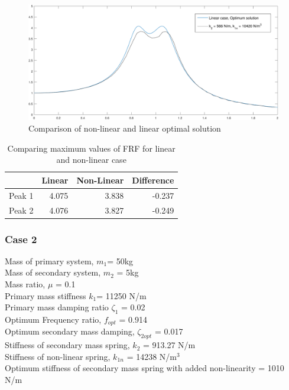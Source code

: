 \begin{figure}[h!]
\includegraphics[width=\textwidth, height = 0.5\textwidth]{"figures/2comparing"}
\caption{Comparison of non-linear and linear optimal solution}
\end{figure}

\begin{table}[h!]
\centering
\begin{tabular}{|r|r|r|r|}
\hline
 & Linear & Non-Linear & Difference \\ \hline
Peak 1& 4.075 & 3.838 & -0.237\\
Peak 2 & 4.076  & 3.827 & -0.249\\ \hline
\end{tabular}
\caption{Comparing maximum values of FRF for linear and non-linear case}
\end{table}

\subsubsection{Case 2}
Mass of primary system, $m_1$= 50kg\\
Mass of secondary system, $m_2$ = 5kg\\
Mass ratio, $\mu$ = 0.1\\
Primary mass stiffness $k_1$= 11250 N/m\\
Primary mass damping ratio $\zeta_1$ = 0.02\\
Optimum Frequency ratio, $f_{opt}$ = 0.914\\
Optimum secondary mass damping, $\zeta_{2opt}$ = 0.017\\
Stiffness of secondary mass spring, $k_2$ = 913.27 N/m \\
Stiffness of non-linear spring, $k_{1n}$ = 14238 N/m$^3$\\
Optimum stiffness of secondary mass spring with added non-linearity = 1010 N/m

